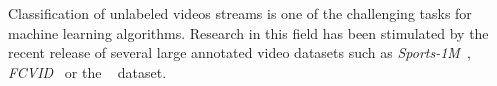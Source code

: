%
%
%
%


Classification of unlabeled videos streams is one of the challenging tasks for machine learning algorithms.
Research in this field has been stimulated by the recent release of several large annotated video datasets such as \emph{Sports-1M}~\cite{karpathy2014large}, \emph{FCVID}~\cite{FCVID} or the \yt~\cite{abu2016youtube} dataset.

